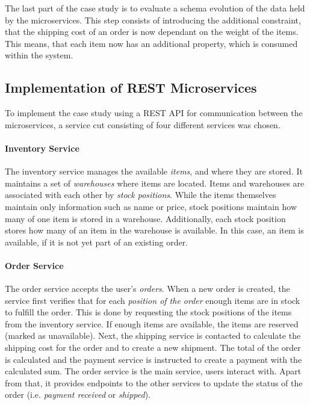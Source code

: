 The last part of the case study is to evaluate a schema evolution of the data held by the microservices.
This step consists of introducing the additional constraint, that the shipping cost of an order is now dependant on the weight of the items.
This means, that each item now has an additional property, which is consumed within the system.

\subsection{Implementation of \acs{REST} Microservices}

To implement the case study using a \ac{REST} \ac{API} for communication between the microservices, a service cut consisting of four different services was chosen.

\paragraph{Inventory Service}

The inventory service manages the available \textit{items}, and where they are stored.
It maintains a set of \textit{warehouses} where items are located.
Items and warehouses are associated with each other by \textit{stock positions}.
While the items themselves maintain only information such as name or price, stock positions maintain how many of one item is stored in a warehouse.
Additionally, each stock position stores how many of an item in the warehouse is available.
In this case, an item is available, if it is not yet part of an existing order.

\paragraph{Order Service}

The order service accepts the user's \textit{orders}.
When a new order is created, the service first verifies that for each \textit{position of the order} enough items are in stock to fulfill the order.
This is done by requesting the stock positions of the items from the inventory service.
If enough items are available, the items are reserved (marked as unavailable).
Next, the shipping service is contacted to calculate the shipping cost for the order and to create a new shipment.
The total of the order is calculated and the payment service is instructed to create a payment with the calculated sum.
The order service is the main service, users interact with.
Apart from that, it provides endpoints to the other services to update the status of the order (i.e. \textit{payment received} or \textit{shipped}).

